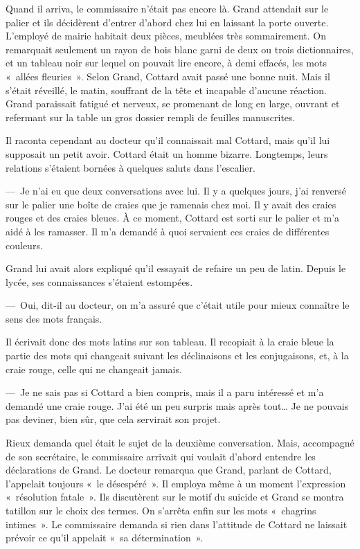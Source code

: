 \documentclass[french,twoside]{book} %
\begin{document}
Quand il arriva, le commissaire n’était pas encore là. Grand attendait sur le palier et ils décidèrent d’entrer d’abord chez lui en laissant la porte ouverte. L’employé de mairie habitait deux pièces, meublées très sommairement. On remarquait seulement un rayon de bois blanc garni de deux ou trois dictionnaires, et un tableau noir sur lequel on pouvait lire encore, à demi effacés, les mots « allées fleuries ». Selon Grand, Cottard avait passé une bonne nuit. Mais il s’était réveillé, le matin, souffrant de la tête et incapable d’aucune réaction. Grand paraissait fatigué et nerveux, se promenant de long en large, ouvrant et refermant sur la table un gros dossier rempli de feuilles manuscrites.\par
Il raconta cependant au docteur qu’il connaissait mal Cottard, mais qu’il lui supposait un petit avoir. Cottard était un homme bizarre. Longtemps, leurs relations s’étaient bornées à quelques saluts dans l’escalier.\par
— Je n’ai eu que deux conversations avec lui. Il y a quelques jours, j’ai renversé sur le palier une boîte de craies que je ramenais chez moi. Il y avait des craies rouges et des craies bleues. À ce moment, Cottard est sorti sur le palier et m’a aidé à les ramasser. Il m’a demandé à quoi servaient ces craies de différentes couleurs.\par
Grand lui avait alors expliqué qu’il essayait de refaire un peu de latin. Depuis le lycée, ses connaissances s’étaient estompées.\par
— Oui, dit-il au docteur, on m’a assuré que c’était utile pour mieux connaître le sens des mots français.\par
Il écrivait donc des mots latins sur son tableau. Il recopiait à la craie bleue la partie des mots qui changeait suivant les déclinaisons et les conjugaisons, et, à la craie rouge, celle qui ne changeait jamais.\par
— Je ne sais pas si Cottard a bien compris, mais il a paru intéressé et m’a demandé une craie rouge. J’ai été un peu surpris mais après tout… Je ne pouvais pas deviner, bien sûr, que cela servirait son projet.\par
Rieux demanda quel était le sujet de la deuxième conversation. Mais, accompagné de son secrétaire, le commissaire arrivait qui voulait d’abord entendre les déclarations de Grand. Le docteur remarqua que Grand, parlant de Cottard, l’appelait toujours « le désespéré ». Il employa même à un moment l’expression « résolution fatale ». Ils discutèrent sur le motif du suicide et Grand se montra tatillon sur le choix des termes. On s’arrêta enfin sur les mots « chagrins intimes ». Le commissaire demanda si rien dans l’attitude de Cottard ne laissait prévoir ce qu’il appelait « sa détermination ».\par
\end{document}
